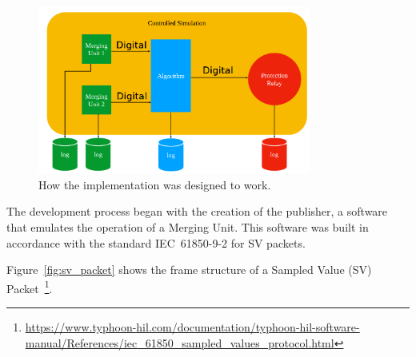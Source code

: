 \begin{figure}[tbh]
	\centering
	\includegraphics[width=0.80\textwidth, keepaspectratio]{ch4/assets/Implementation.png} %
	\caption{How the implementation was designed to work.}
	\label{fig:overview_of_implementation}
\end{figure}
\FloatBarrier

The development process began with the creation of the publisher, a software that emulates the operation of a Merging Unit. This software was built in accordance with the standard IEC~61850-9-2 for SV packets.

Figure~\ref{fig:sv_packet} shows the frame structure of a Sampled Value (SV) Packet~\footnote{\url{https://www.typhoon-hil.com/documentation/typhoon-hil-software-manual/References/iec_61850_sampled_values_protocol.html}}.

